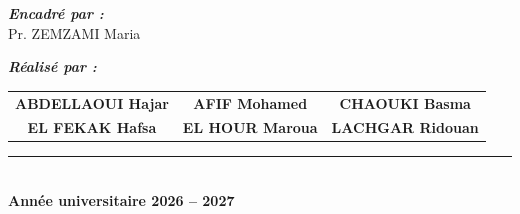 \begin{titlepage}
\vspace{1.2cm}

\begin{center}

{\fontsize{12}{15}\selectfont
\bfseries\itshape\color{EnsamBlue}
Encadré par :}\\[0.4cm]

{\fontsize{13}{17}\selectfont
Pr. ZEMZAMI Maria}

\vspace{1.1cm}

{\fontsize{12}{15}\selectfont
\bfseries\itshape\color{EnsamBlue}
Réalisé par :}

\vspace{0.5cm}

\begin{tabular}{ccc}
\fontsize{12}{16}\selectfont\bfseries ABDELLAOUI Hajar &
\fontsize{12}{16}\selectfont\bfseries AFIF Mohamed &
\fontsize{12}{16}\selectfont\bfseries CHAOUKI Basma \\[0.45cm]

\fontsize{12}{16}\selectfont\bfseries EL FEKAK Hafsa &
\fontsize{12}{16}\selectfont\bfseries EL HOUR Maroua &
\fontsize{12}{16}\selectfont\bfseries LACHGAR Ridouan
\end{tabular}

\end{center}

\vfill

\begin{center}
    {\color{EnsamBlue}\rule{0.55\textwidth}{0.8pt}}\\[0.35cm]

    {\fontsize{12}{15}\selectfont
    \bfseries\color{gray}
    Année universitaire 2026 -- 2027}
\end{center}

\end{titlepage}

\clearpage
\thispagestyle{empty}
\mbox{}
\clearpage
